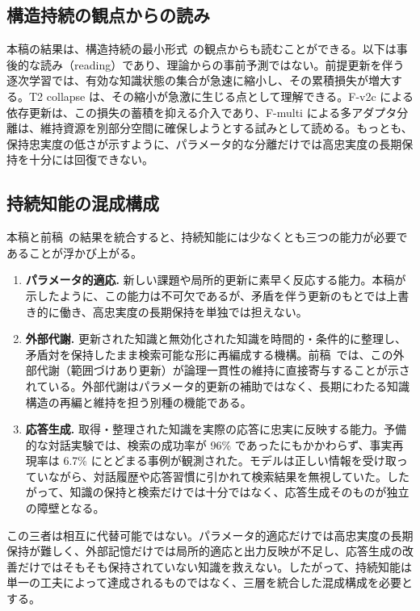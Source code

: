 \documentclass[12pt,a4paper]{article}
\begin{document}
\subsection{構造持続の観点からの読み}

本稿の結果は、構造持続の最小形式~\cite{paper1}の観点からも読むことができる。以下は事後的な読み（reading）であり、理論からの事前予測ではない。前提更新を伴う逐次学習では、有効な知識状態の集合が急速に縮小し、その累積損失が増大する。T2 collapse は、その縮小が急激に生じる点として理解できる。F-v2c による依存更新は、この損失の蓄積を抑える介入であり、F-multi による多アダプタ分離は、維持資源を別部分空間に確保しようとする試みとして読める。もっとも、保持忠実度の低さが示すように、パラメータ的な分離だけでは高忠実度の長期保持を十分には回復できない。

\subsection{持続知能の混成構成}

本稿と前稿~\cite{paper3}の結果を統合すると、持続知能には少なくとも三つの能力が必要であることが浮かび上がる。

\begin{enumerate}
  \item \textbf{パラメータ的適応.} 新しい課題や局所的更新に素早く反応する能力。本稿が示したように、この能力は不可欠であるが、矛盾を伴う更新のもとでは上書き的に働き、高忠実度の長期保持を単独では担えない。
  \item \textbf{外部代謝.} 更新された知識と無効化された知識を時間的・条件的に整理し、矛盾対を保持したまま検索可能な形に再編成する機構。前稿~\cite{paper3}では、この外部代謝（範囲づけあり更新）が論理一貫性の維持に直接寄与することが示されている。外部代謝はパラメータ的更新の補助ではなく、長期にわたる知識構造の再編と維持を担う別種の機能である。
  \item \textbf{応答生成.} 取得・整理された知識を実際の応答に忠実に反映する能力。予備的な対話実験では、検索の成功率が 96\% であったにもかかわらず、事実再現率は 6.7\% にとどまる事例が観測された。モデルは正しい情報を受け取っていながら、対話履歴や応答習慣に引かれて検索結果を無視していた。したがって、知識の保持と検索だけでは十分ではなく、応答生成そのものが独立の障壁となる。
\end{enumerate}

この三者は相互に代替可能ではない。パラメータ的適応だけでは高忠実度の長期保持が難しく、外部記憶だけでは局所的適応と出力反映が不足し、応答生成の改善だけではそもそも保持されていない知識を救えない。したがって、持続知能は単一の工夫によって達成されるものではなく、三層を統合した混成構成を必要とする。
\end{document}
